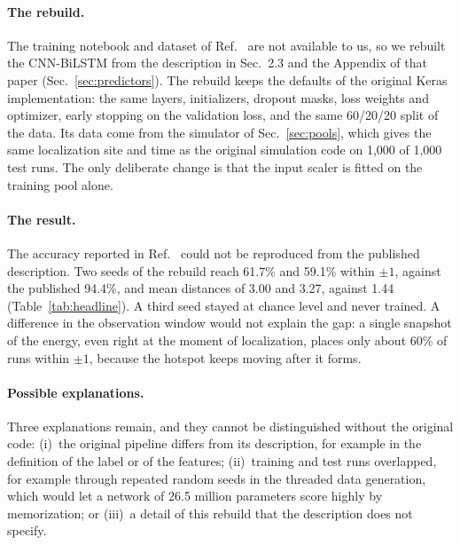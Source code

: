 \documentclass[11pt]{article}
\begin{document}
\paragraph{The rebuild.} The training notebook and dataset of Ref.~\cite{mittal2026jand} are not available to us, so we rebuilt the CNN-BiLSTM from the description in Sec.~2.3 and the Appendix of that paper (Sec.~\ref{sec:predictors}). The rebuild keeps the defaults of the original Keras implementation: the same layers, initializers, dropout masks, loss weights and optimizer, early stopping on the validation loss, and the same 60/20/20 split of the data. Its data come from the simulator of Sec.~\ref{sec:pools}, which gives the same localization site and time as the original simulation code on 1,000 of 1,000 test runs. The only deliberate change is that the input scaler is fitted on the training pool alone.

\paragraph{The result.} The accuracy reported in Ref.~\cite{mittal2026jand} could not be reproduced from the published description. Two seeds of the rebuild reach 61.7\% and 59.1\% within $\pm1$, against the published 94.4\%, and mean distances of 3.00 and 3.27, against 1.44 (Table~\ref{tab:headline}). A third seed stayed at chance level and never trained. A difference in the observation window would not explain the gap: a single snapshot of the energy, even right at the moment of localization, places only about 60\% of runs within $\pm1$, because the hotspot keeps moving after it forms.

\paragraph{Possible explanations.} Three explanations remain, and they cannot be distinguished without the original code: (i)~the original pipeline differs from its description, for example in the definition of the label or of the features; (ii)~training and test runs overlapped, for example through repeated random seeds in the threaded data generation, which would let a network of 26.5 million parameters score highly by memorization; or (iii)~a detail of this rebuild that the description does not specify.
\end{document}

